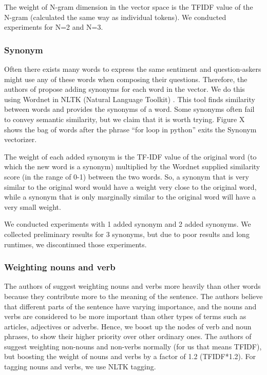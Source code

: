 \documentclass{acm_proc_article-sp}
\begin{document}
The weight of N-gram dimension in the vector space is the TFIDF value of the N-gram (calculated the same way as individual tokens). We conducted experiments for N=2 and N=3. 

\subsubsection{Synonym}
Often there exists many words to express the same sentiment and question-askers might use any of these words when composing their questions. Therefore, the authors of \cite{liu2009searching} propose adding synonyms for each word in the vector. We do this using Wordnet in NLTK (Natural Language Toolkit) \cite{NLTK}. This tool finds similarity between words and provides the synonyms of a word. Some synonyms often fail to convey semantic similarity, but we claim that it is worth trying. Figure X shows the bag of words after the phrase ``for loop in python” exits the Synonym vectorizer. 

The weight of each added synonym is the TF-IDF value of the original word (to which the new word is a synonym) multiplied by the Wordnet supplied similarity  score (in the range of 0-1) between the two words. So, a synonym that is very similar to the original word would have a weight very close to the original word, while a synonym that is only marginally similar to the original word will have a very small weight.

We conducted experiments with 1 added synonym and 2 added synonyms. We collected preliminary results for 3 synonyms, but due to poor results and long runtimes, we discontinued those experiments.

\subsubsection{Weighting nouns and verb}
The authors of \cite{wang2009syntactic} suggest weighting nouns and verbs more heavily than other words because they contribute more to the meaning of the sentence. The authors believe that different parts of the sentence have varying importance, and the nouns and verbs are considered to be more important than other types of terms such as articles, adjectives or adverbs. Hence, we boost up the nodes of verb and noun phrases, to show their higher priority over other ordinary ones. The authors of \cite{wang2009syntactic} suggest weighting non-nouns and non-verbs normally (for us that means TFIDF), but boosting the weight of nouns and verbs by a factor of 1.2 (TFIDF*1.2). For tagging nouns and verbs, we use NLTK tagging.
\end{document}
